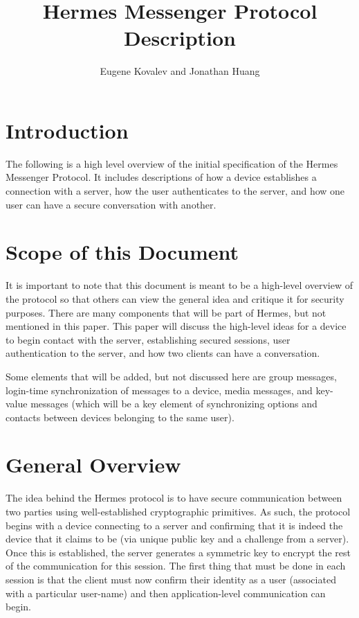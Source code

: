 \documentclass{article}
\begin{document}
\title{Hermes Messenger Protocol Description}
\author{Eugene Kovalev and Jonathan Huang}

\maketitle

\section{Introduction}

The following is a high level overview of the initial specification of the Hermes Messenger Protocol. It includes descriptions of how a device establishes a connection with a server, how the user authenticates to the server, and how one user can have a secure conversation with another.

\section{Scope of this Document}

It is important to note that this document is meant to be a high-level overview of the protocol so that others can view the general idea and critique it for security purposes. There are many components that will be part of Hermes, but not mentioned in this paper. This paper will discuss the high-level ideas for a device to begin contact with the server, establishing secured sessions, user authentication to the server, and how two clients can have a conversation.

Some elements that will be added, but not discussed here are group messages, login-time synchronization of messages to a device, media messages, and key-value messages (which will be a key element of synchronizing options and contacts between devices belonging to the same user).

\section{General Overview}

The idea behind the Hermes protocol is to have secure communication between two parties using well-established cryptographic primitives. As such, the protocol begins with a device connecting to a server and confirming that it is indeed the device that it claims to be (via unique public key and a challenge from a server). Once this is established, the server generates a symmetric key to encrypt the rest of the communication for this session. The first thing that must be done in each session is that the client must now confirm their identity as a user (associated with a particular user-name) and then application-level communication can begin.
\end{document}
